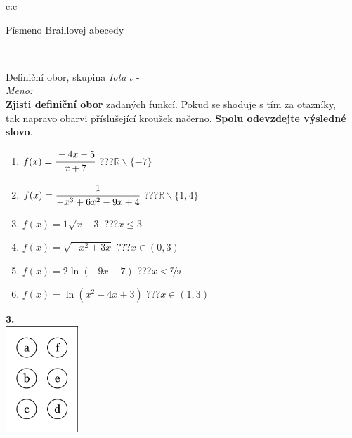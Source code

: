 \documentclass[10pt]{report}
\begin{document}
\begin{tabular}{c:c}
\begin{minipage}[c][99mm][t]{0.49\linewidth}
\begin{center}
\begin{minipage}{0.20\linewidth}
\begin{center}
{\small Písmeno Braillovej abecedy}
\end{center}
\end{minipage}
\end{center}
\end{minipage}
\\ \hdashline
\begin{minipage}[c][99mm][t]{0.49\linewidth}
\begin{center}
\vspace{7mm}
{\huge Definiční obor, skupina \textit{Iota $\iota$} -}\\[4.5mm]
\textit{Meno:}\phantom{xxxxxxxxxxxxxxxxxxxxxxxxxxxxxxxxxxxxxxxxxxxxxxxxxxxxxxxxxxxxxxxxx}\\[3.5mm]
\textbf{Zjisti definiční obor} zadaných funkcí. Pokud se shoduje s tím za otazníky,\\tak napravo obarvi příslušející kroužek načerno. \textbf{Spolu odevzdejte výsledné slovo}.\\[3mm]
\begin{minipage}{0.77\linewidth}
\begin{center}
\begin{varwidth}{\textwidth}
\begin{enumerate}
\normalsize
\item $f(x)=\cfrac{-4x-5}{x+7}$\quad \dotfill\; ???\;\dotfill \quad $\mathbb{R}\smallsetminus\{-7\}$
\item $f(x)=\cfrac{1}{-x^3+6x^2-9x+4}$\quad \dotfill\; ???\;\dotfill \quad $\mathbb{R}\smallsetminus\{1,4\}$
\item $f(x)=1\sqrt{x-3}$\quad \dotfill\; ???\;\dotfill \quad $x\leq3$
\item $f(x)=\sqrt{-x^2+3x}$\quad \dotfill\; ???\;\dotfill \quad $x\in(0 , 3)$
\item $f(x)=2\ln{(-9x-7)}$\quad \dotfill\; ???\;\dotfill \quad $x<\nicefrac{7}{9}$
\item $f(x)=\ln{(x^2-4x+3)}$\quad \dotfill\; ???\;\dotfill \quad $x\in(1 , 3)$
\end{enumerate}
\end{varwidth}
\end{center}
\end{minipage}
\begin{minipage}{0.20\linewidth}
\begin{center}
{\Huge\bfseries 3.} \\[2mm]
\includegraphics[height=40mm]{../images/braille.png}

\end{center}
\end{minipage}
\end{center}
\end{minipage}
\end{tabular}
\end{document}
